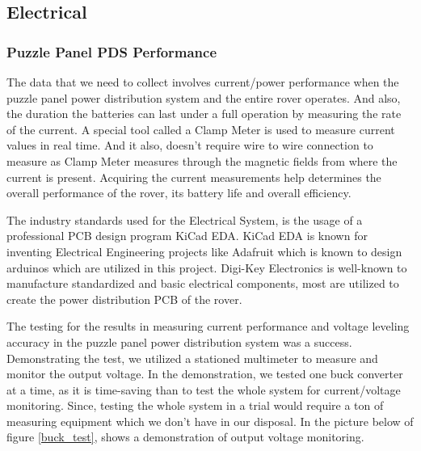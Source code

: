\documentclass[a4paper, 10pt]{article}
\begin{document}
	\subsection{Electrical}

	\subsubsection*{Puzzle Panel PDS Performance}	

	The data that we need to collect involves current/power performance when the puzzle panel power distribution system and the entire rover operates. And also, the duration the batteries can last under a full operation by measuring the rate of the current. A special tool called a Clamp Meter is used to measure current values in real time. And it also, doesn't require wire to wire connection to measure as Clamp Meter measures through the magnetic fields from where the current is present. Acquiring the current measurements help determines the overall performance of the rover, its battery life and overall efficiency.

	The industry standards used for the Electrical System, is the usage of a professional PCB design program KiCad EDA. KiCad EDA is known for inventing Electrical Engineering projects like Adafruit which is known to design arduinos which are utilized in this project. Digi-Key Electronics is well-known to manufacture standardized and basic electrical components, most are utilized to create the power distribution PCB of the rover.

	The testing for the results in measuring current performance and voltage leveling accuracy in the puzzle panel power distribution system was a success. Demonstrating the test, we utilized a stationed multimeter to measure and monitor the output voltage. In the demonstration, we tested one buck converter at a time, as it is time-saving than to test the whole system for current/voltage monitoring. Since, testing the whole system in a trial would require a ton of measuring equipment which we don't have in our disposal. In the picture below of figure \ref{buck_test}, shows a demonstration of output voltage monitoring.  
\end{document}
